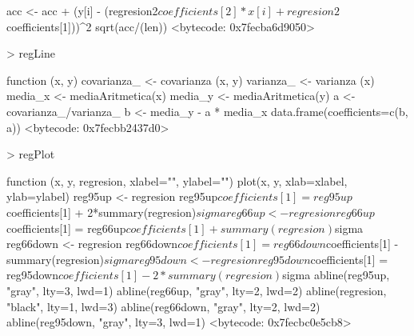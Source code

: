 \documentclass [a4paper] {article}
\begin{document}
\begin{Schunk}
\begin{Soutput}
{{    acc <- acc + (y[i] - (regresion2$coefficients[2]*x[i]+regresion2$coefficients[1]))^2
  }
  sqrt(acc/(len))
}
<bytecode: 0x7fecba6d9050>
\end{Soutput}
\begin{Sinput}
> regLine
\end{Sinput}
\begin{Soutput}
function (x, y) {
  covarianza_ <- covarianza (x, y)
  varianza_ <- varianza (x)
  media_x <- mediaAritmetica(x)
  media_y <- mediaAritmetica(y)
  a <- covarianza_/varianza_
  b <- media_y - a * media_x
  data.frame(coefficients=c(b, a))
}
<bytecode: 0x7fecbb2437d0>
\end{Soutput}
\begin{Sinput}
> regPlot
\end{Sinput}
\begin{Soutput}
function (x, y, regresion, xlabel="", ylabel="") {
  plot(x, y, xlab=xlabel, ylab=ylabel)
  reg95up <- regresion
  reg95up$coefficients[1] = reg95up$coefficients[1] + 2*summary(regresion)$sigma
  reg66up <- regresion
  reg66up$coefficients[1] = reg66up$coefficients[1] + summary(regresion)$sigma
  reg66down <- regresion
  reg66down$coefficients[1] = reg66down$coefficients[1] - summary(regresion)$sigma
  reg95down <- regresion
  reg95down$coefficients[1] = reg95down$coefficients[1] - 2*summary(regresion)$sigma
  abline(reg95up, "gray", lty=3, lwd=1)
  abline(reg66up, "gray", lty=2, lwd=2)
  abline(regresion, "black", lty=1, lwd=3)
  abline(reg66down, "gray", lty=2, lwd=2)
  abline(reg95down, "gray", lty=3, lwd=1)
}
<bytecode: 0x7fecbc0e5cb8>
\end{Soutput}
\end{Schunk}
\end{document}
